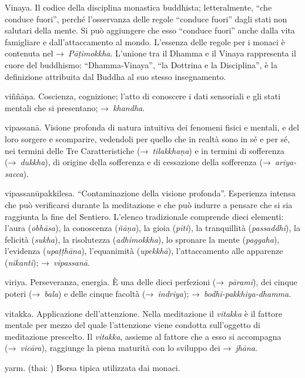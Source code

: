 \begin{glossarydescription}
\item[Vinaya.] Il codice della disciplina monastica buddhista;
  letteralmente, ``che conduce fuori'', perché l'osservanza delle regole
  ``conduce fuori'' dagli stati non salutari della mente. Si può aggiungere che
  esso ``conduce fuori'' anche dalla vita famigliare e dall'attaccamento al
  mondo. L'essenza delle regole per i monaci è contenuta nel
  →~\emph{Pāṭimokkha}. L'unione tra il Dhamma e il Vinaya rappresenta il cuore
  del buddhismo: ``Dhamma-Vinaya'', ``la Dottrina e la Disciplina'', è la
  definizione attribuita dal Buddha al suo stesso insegnamento.

\item[viññāṇa.] Coscienza, cognizione; l'atto di conoscere i dati
  sensoriali e gli stati mentali che si presentano; →~\emph{khandha}.

\item[vipassanā.] Visione profonda di natura intuitiva dei fenomeni fisici
  e mentali, e del loro sorgere e scomparire, vedendoli per quello che in realtà
  sono in sé e per sé, nei termini delle Tre Caratteristiche
  (→~\emph{tilakkhaṇa}) e in termini di sofferenza (→~\emph{dukkha}), di origine
  della sofferenza e di cessazione della sofferenza (→~\emph{ariya-sacca}).

\item[vipassanūpakkilesa.] ``Contaminazione della visione profonda''.
  Esperienza intensa che può verificarsi durante la meditazione e che può
  indurre a pensare che si sia raggiunta la fine del Sentiero. L'elenco
  tradizionale comprende dieci elementi: l'aura (\emph{obhāsa}), la conoscenza
  (\emph{ñāṇa}), la gioia (\emph{pīti}), la tranquillità (\emph{passaddhi}), la
  felicità (\emph{sukha}), la risolutezza (\emph{adhimokkha}), lo spronare la
  mente (\emph{paggaha}), l'evidenza (\emph{upaṭṭhāna}), l'equanimità
  (\emph{upekkhā}), l'attaccamento alle apparenze (\emph{nikanti});
  →~\emph{vipassanā}.

\item[viriya.] Perseveranza, energia. È una delle dieci perfezioni
  (→~\emph{pāramī}), dei cinque poteri (→~\emph{bala}) e delle cinque facoltà
  (→~\emph{indriya}); →~\emph{bodhi-pakkhiya-dhamma}.

\item[vitakka.] Applicazione dell'attenzione. Nella meditazione il
  \emph{vitakka} è il fattore mentale per mezzo del quale l'attenzione viene
  condotta sull'oggetto di meditazione prescelto. Il \emph{vitakka}, assieme al
  fattore che a esso si accompagna (→~\emph{vicāra}), raggiunge la piena
  maturità con lo sviluppo dei →~\emph{jhāna}.



\item[yarm.] (thai: ) Borsa tipica utilizzata dai monaci.

\end{glossarydescription}

